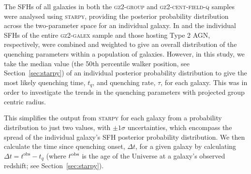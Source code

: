 \documentclass[useAMS,usenatbib]{mn2e}
\begin{document}
The SFHs of all galaxies in both the \textsc{gz2-group} and \textsc{gz2-cent-field-q} samples were analysed using \textsc{starpy}, providing the posterior probability distribution across the two-parameter space for an individual galaxy. In \cite{smethurst15} and \cite{smethurst16} the individual SFHs of the entire \textsc{gz2-galex} sample and those hosting Type 2 AGN, respectively, were combined and weighted to give an overall distribution of the quenching parameters within a population of galaxies. However, in this study, we take the median value (the 50th percentile walker position, see Section~\ref{sec:starpy}) of an individual posterior probability distribution to give the most likely quenching time, $t_{q}$, and quenching rate, $\tau$, for each galaxy. This was in order to investigate the trends in the quenching parameters with projected group centric radius. 

This simplifies the output from \textsc{starpy} for each galaxy from a probability distribution to just two values, with $\pm1\sigma$ uncertainties, which encompass the spread of the individual galaxy's SFH posterior probability distribution. We then calculate the time since quenching onset, $\Delta t$, for a given galaxy by calculating {\bf $\Delta t = t^\mathrm{obs} - t_{q}$} (where $t^{\rm{obs}}$ is the age of the Universe at a galaxy's observed redshift; see Section~\ref{sec:starpy}). 
\end{document}
